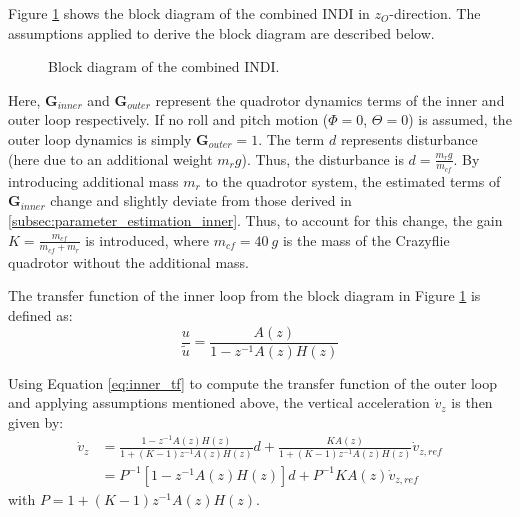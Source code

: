 \documentclass[11pt, a4paper, twoside]{report}
\begin{document}
Figure \ref{fig:experiment_block_diag} shows the block diagram of the combined \acrshort{INDI} in $z_O$-direction. The assumptions applied to derive the block diagram are described below.
\begin{figure}[H]
	\centering 
	\captionsetup{justification=centering, singlelinecheck=off, font=bf, belowskip=-0.5cm}
	\caption[Block diagram of the combined \acrshort{INDI}]{Block diagram of the combined \acrshort{INDI}.}
	\label{fig:experiment_block_diag}
\end{figure}

Here, $\bm{G}_{inner}$ and $\bm{G}_{outer}$ represent the quadrotor dynamics terms of the inner and outer loop respectively. If no roll and pitch motion ($\Phi=0$, $\Theta=0$) is assumed, the outer loop dynamics is simply $\bm{G}_{outer} = 1$. The term $d$ represents disturbance (here due to an additional weight $m_r g$). Thus, the disturbance is $d=\frac{m_r g}{m_{cf}}$. By introducing additional mass $m_r$ to the quadrotor system, the estimated terms of $\bm{G}_{inner}$ change and slightly deviate from those derived in \ref{subsec:parameter_estimation_inner}. Thus, to account for this change, the gain $K = \frac{m_{cf}}{m_{cf} + m_r}$ is introduced, where $m_{cf}=40~\si{g}$ is the mass of the Crazyflie quadrotor without the additional mass.  

The transfer function of the inner loop from the block diagram in Figure \ref{fig:experiment_block_diag} is defined as: 
\begin{equation}
	\frac{u}{\tilde{u}} = \frac{A(z)}{1-z^{-1}A(z)H(z)}
	\label{eq:inner_tf}
\end{equation}

Using Equation \ref{eq:inner_tf} to compute the transfer function of the outer loop and applying assumptions mentioned above, the vertical acceleration $\dot{v}_{z}$ is then given by: 
\begin{equation}
	\begin{split}
	\dot{v}_{z} &= \frac{1-z^{-1}A(z)H(z)}{1+(K-1)z^{-1}A(z)H(z)}d + \frac{KA(z)}{1+(K-1)z^{-1}A(z)H(z)} \dot{v}_{z,ref} \\
	&= P^{-1}[1-z^{-1}A(z)H(z)]d + P^{-1}KA(z)\dot{v}_{z,ref}
	\label{eq:experiment_tf}
	\end{split}
\end{equation}
with $P = 1+(K-1)z^{-1}A(z)H(z)$.
\end{document}
